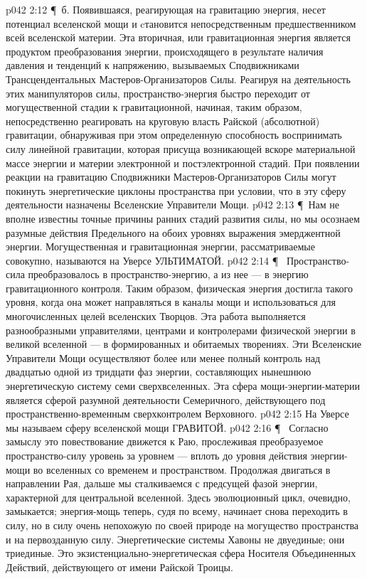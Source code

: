 \vs p042 2:12 \P\ б.  Появившаяся, реагирующая на гравитацию энергия, несет потенциал вселенской мощи и cтановится непосредственным предшественником всей вселенской материи. Эта вторичная, или гравитационная энергия является продуктом преобразования энергии, происходящего в результате наличия давления и тенденций к напряжению, вызываемых Сподвижниками Трансцендентальных Мастеров\hyp{}Организаторов Силы. Реагируя на деятельность этих манипуляторов силы, пространство\hyp{}энергия быстро переходит от могущественной стадии к гравитационной, начиная, таким образом, непосредственно реагировать на круговую власть Райской (абсолютной) гравитации, обнаруживая при этом определенную способность воспринимать силу линейной гравитации, которая присуща возникающей вскоре материальной массе энергии и материи электронной и постэлектронной стадий. При появлении реакции на гравитацию Сподвижники Мастеров\hyp{}Организаторов Силы могут покинуть энергетические циклоны пространства при условии, что в эту сферу деятельности назначены Вселенские Управители Мощи.
\vs p042 2:13 \P\ Нам не вполне известны точные причины ранних стадий развития силы, но мы осознаем разумные действия Предельного на обоих уровнях выражения эмерджентной энергии. Могущественная и гравитационная энергии, рассматриваемые совокупно, называются на Уверсе УЛЬТИМАТОЙ.
\vs p042 2:14 \P\ \bibnobreakspace {} Пространство\hyp{}сила преобразовалось в пространство\hyp{}энергию, а из нее --- в энергию гравитационного контроля. Таким образом, физическая энергия достигла такого уровня, когда она может направляться в каналы мощи и использоваться для многочисленных целей вселенских Творцов. Эта работа выполняется разнообразными управителями, центрами и контролерами физической энергии в великой вселенной --- в формированных и обитаемых творениях. Эти Вселенские Управители Мощи осуществляют более или менее полный контроль над двадцатью одной из тридцати фаз энергии, составляющих нынешнюю энергетическую систему семи сверхвселенных. Эта сфера мощи\hyp{}энергии\hyp{}материи является сферой разумной деятельности Семеричного, действующего под пространственно\hyp{}временным сверхконтролем Верховного.
\vs p042 2:15 На Уверсе мы называем сферу вселенской мощи ГРАВИТОЙ.
\vs p042 2:16 \P\ \bibnobreakspace {} Согласно замыслу это повествование движется к Раю, прослеживая преобразуемое пространство\hyp{}силу уровень за уровнем --- вплоть до уровня действия энергии\hyp{}мощи во вселенных со временем и пространством. Продолжая двигаться в направлении Рая, дальше мы сталкиваемся с предсущей фазой энергии, характерной для центральной вселенной. Здесь эволюционный цикл, очевидно, замыкается; энергия\hyp{}мощь теперь, судя по всему, начинает снова переходить в силу, но в силу очень непохожую по своей природе на могущество пространства и на первозданную силу. Энергетические системы Хавоны не двуединые; они триединые. Это экзистенциально\hyp{}энергетическая сфера Носителя Объединенных Действий, действующего от имени Райской Троицы.
